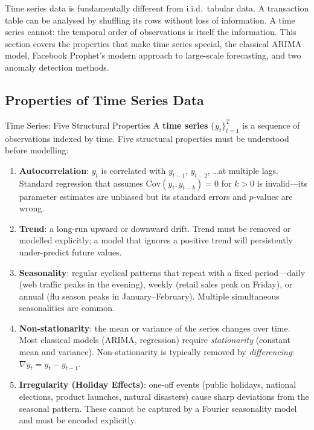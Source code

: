 Time series data is fundamentally different from i.i.d.\ tabular data.
A transaction table can be analysed by shuffling its rows without loss
of information. A time series cannot: the temporal order of observations
is itself the information. This section covers the properties that make
time series special, the classical ARIMA model, Facebook Prophet's
modern approach to large-scale forecasting, and two anomaly detection methods.

\subsection{Properties of Time Series Data}
\label{subsec:ts-properties}

\begin{defbox}{Time Series: Five Structural Properties}
A \textbf{time series} $\{y_t\}_{t=1}^{T}$ is a sequence of observations
indexed by time. Five structural properties must be understood before
modelling:
\begin{enumerate}
  \item \textbf{Autocorrelation}: $y_t$ is correlated with $y_{t-1}$,
        $y_{t-2}$, \ldots at multiple lags. Standard regression that
        assumes $\text{Cov}(y_t, y_{t-k}) = 0$ for $k > 0$ is
        invalid---its parameter estimates are unbiased but its standard
        errors and $p$-values are wrong.
  \item \textbf{Trend}: a long-run upward or downward drift.
        Trend must be removed or modelled explicitly; a model that ignores
        a positive trend will persistently under-predict future values.
  \item \textbf{Seasonality}: regular cyclical patterns that repeat
        with a fixed period---daily (web traffic peaks in the evening),
        weekly (retail sales peak on Friday), or annual (flu season peaks
        in January--February). Multiple simultaneous seasonalities are
        common.
  \item \textbf{Non-stationarity}: the mean or variance of the series
        changes over time. Most classical models (ARIMA, regression)
        require \emph{stationarity} (constant mean and variance).
        Non-stationarity is typically removed by \emph{differencing}:
        $\nabla y_t = y_t - y_{t-1}$.
  \item \textbf{Irregularity (Holiday Effects)}: one-off events
        (public holidays, national elections, product launches, natural
        disasters) cause sharp deviations from the seasonal pattern.
        These cannot be captured by a Fourier seasonality model and must
        be encoded explicitly.
\end{enumerate}
\end{defbox}

